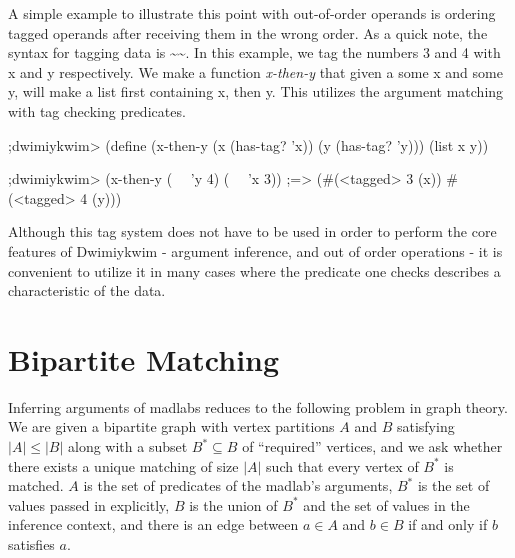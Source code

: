 \documentclass[11pt]{article}
\begin{document}
A simple example to illustrate this point with out-of-order operands
is ordering tagged operands after receiving them in the wrong order.
As a quick note, the syntax for tagging data is \textasciitilde\textasciitilde.
In this example, we tag the numbers 3 and 4 with x and y respectively.
We make a function \textit{x-then-y} that given a some x and some y,
will make a list first containing x, then y.
This utilizes the argument matching with tag checking predicates.

\begin{verbbox}
;dwimiykwim>
(define (x-then-y (x (has-tag? 'x)) (y (has-tag? 'y)))
  (list x y))

;dwimiykwim>
(x-then-y (~~ 'y 4) (~~ 'x 3))
;=> (#(<tagged> 3 (x)) #(<tagged> 4 (y)))
\end{verbbox}
\begin{center}\theverbbox\end{center}

Although this tag system does not have to be used in order to perform
the core features of Dwimiykwim - argument inference,
and out of order operations - it is convenient to utilize it
in many cases where the predicate one checks
describes a characteristic of the data.


\section{Bipartite Matching}\label{bipartite}

Inferring arguments of madlabs
reduces to the following problem in graph theory.
We are given a bipartite graph with vertex partitions $A$ and $B$
satisfying $|A| \leq |B|$
along with a subset $B^* \subseteq B$ of ``required'' vertices,
and we ask whether there exists a unique matching of size $|A|$
such that every vertex of $B^*$ is matched.
$A$ is the set of predicates of the madlab's arguments,
$B^*$ is the set of values passed in explicitly,
$B$ is the union of $B^*$ and the set of values in the inference context,
and there is an edge between $a \in A$ and $b \in B$
if and only if $b$ satisfies $a$.
\end{document}
